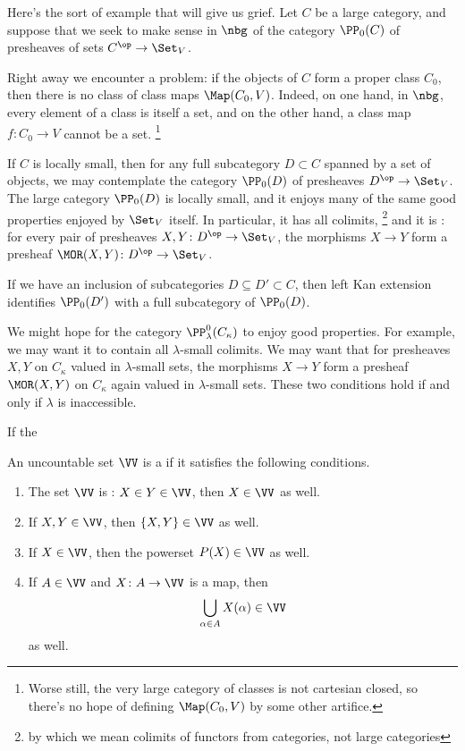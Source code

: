 \begin{eg}%
\label{eg:bigpresheaves}
	Here's the sort of example that will give us grief.
	Let $ C $ be a large category,
	and suppose that we seek to make sense in $ \nbg $ of the category $ \PP_0(C) $ of presheaves of sets $ C^{\op} \to \Set_V $.
	
	Right away we encounter a problem:
	if the objects of $ C $ form a proper class $ C_ 0 $, then there is no class of class maps $ \Map(C_0, V) $.
	Indeed, on one hand, in $ \nbg $, every element of a class is itself a set,
	and on the other hand, a class map $ f \colon C_0 \to V $ cannot be a set.%
	\footnote{Worse still, the very large category of classes is not cartesian closed,
	so there's no hope of defining $ \Map(C_0, V) $ by some other artifice.}
	
	If $ C $ is locally small, then for any full subcategory $ D \subset C $ spanned by a set of objects,
	we may contemplate the category $ \PP_0(D) $ of presheaves $ D^{\op} \to \Set_V $.
	The large category $ \PP_0(D) $ is locally small,
	and it enjoys many of the same good properties enjoyed by $ \Set_V $ itself.
	In particular, it has all colimits,%
	\footnote{by which we mean colimits of functors from categories, not large categories}
	and it is :
	for every pair of presheaves $ X, Y \colon D^{\op} \to \Set_V $,
	the morphisms $ X \to Y $ form a presheaf $ \MOR(X, Y) \colon D^{\op} \to \Set_V $.

	If we have an inclusion of subcategories $ D \subseteq D' \subset C $, then left Kan extension identifies
	$ \PP_0(D') $ with a full subcategory of $ \PP_0(D) $.


	We might hope for the category $ \PP^0_{\lambda}(C_{\kappa}) $ to enjoy good properties.
	For example, we may want it to contain all $ \lambda $-small colimits.
	We may want that for presheaves $ X, Y $ on $ C_{\kappa} $ valued in $ \lambda $-small sets,
	the morphisms $ X \to Y $ form a presheaf $ \MOR(X, Y) $ on $ C_{\kappa} $ again valued in $ \lambda $-small sets.
	These two conditions hold if and only if $ \lambda $ is inaccessible.

	If the 
\end{eg}


\begin{definition}%
\label{dfn:uni}
	An uncountable set $\VV$ is a  if it satisfies the following conditions.
	\begin{enumerate}
		\item The set $\VV$ is : $X\in Y\in\VV$, then $X\in\VV$ as well.
		\item If $X,Y\in\VV$, then $\{X,Y\}\in\VV$ as well.
		\item If $X\in\VV$, then the powerset $P(X)\in\VV$ as well.
		\item If $A\in\VV$ and $X \colon A \to \VV$ is a map, then
		\[
			\bigcup_{\alpha\in A}X(\alpha) \in \VV
		\]
		as well.
	\end{enumerate}
\end{definition}

